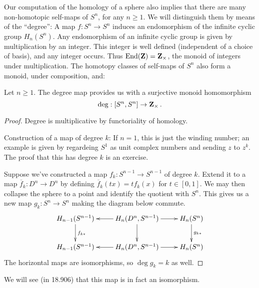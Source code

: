 Our computation of the homology of a sphere also implies that there are many non-homotopic self-maps of $S^n$, for any $n\geq1$. We will distinguish them by means of the ``degree'': A map $f:S^n\to S^n$ induces an endomorphism of the infinite cyclic group $H_n(S^n)$. Any endomorphism of an infinite cyclic group is given by multiplication by an integer. This integer is well defined (independent of a choice of basis), and any integer occurs. Thus $\mathrm{End}(\mathbf Z)=\mathbf Z_\times$, the monoid of integers under multiplication. The homotopy classes of self-maps of $S^n$ also form a monoid, under composition, and: 
\begin{theorem}
Let $n\geq 1$. The degree map provides us with a surjective monoid homomorphism
\[
\mathrm{deg}:[S^n,S^n]\to \mathbf Z_\times\,.
\]
\end{theorem}
\begin{proof}
Degree is multiplicative by functoriality of homology.

Construction of a map of degree $k$: If $n=1$, this is just the winding number; an example is given by regardeing $S^1$ as unit complex numbers and sending $z$ to $z^k$. The proof that this has degree $k$ is an exercise. 

Suppose we've constructed a map $f_k:S^{n-1}\to S^{n-1}$ of degree $k$. 
Extend it to a map $\overline f_k:D^n\to D^n$ by defining 
$\overline f_k(tx)=tf_k(x)$ for $t\in[0,1]$. We may then collapse the sphere
to a point and identify the quotient with $S^n$. This gives us a new map
$g_k:S^n\to S^n$ making the diagram below commute.
	\begin{equation*}
	\xymatrix{ H_{n-1}(S^{n-1})\ar[d]^{f_{k*}} & \ar[l] H_n(D^n,S^{n-1})\ar[r]\ar[d] & H_n(S^n) \ar[d]^{g_{k*}}\\
	 H_{n-1}(S^{n-1}) & \ar[l] H_n(D^n,S^{n-1})\ar[r] & H_n(S^n)}
	\end{equation*}
The horizontal maps are isomorphisms, so $\deg g_k=k$ as well.
\end{proof}

We will see (in 18.906) that this map is in fact an isomorphism. 


